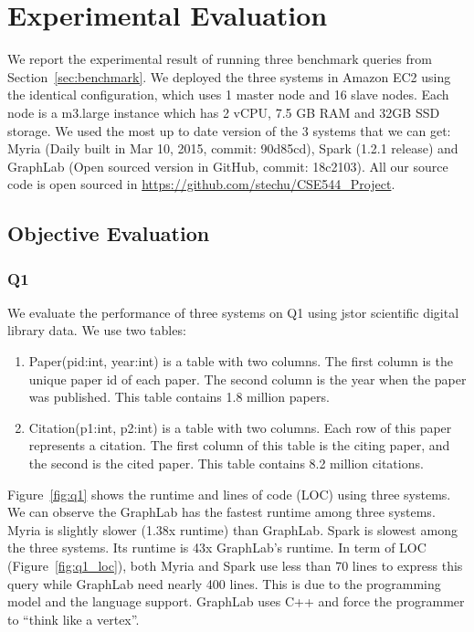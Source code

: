 \section{Experimental Evaluation}

We report the experimental result of running three benchmark queries from 
Section~\ref{sec:benchmark}. We deployed the three systems in Amazon EC2 using 
the identical configuration, which uses 1 master node and 16 slave nodes.
Each node is a m3.large instance which has 2 vCPU, 7.5 GB RAM and 32GB SSD 
storage. We used the most up to date version of the 3 systems that we can get:
Myria (Daily built in Mar 10, 2015, commit: 90d85cd), Spark (1.2.1 release) and
GraphLab (Open sourced version in GitHub, commit: 18c2103). All our source code
is open sourced in \url{https://github.com/stechu/CSE544_Project}.

\subsection{Objective Evaluation}
\label{subsec:obje}

\subsubsection{Q1}

We evaluate the performance of three systems on Q1 using jstor scientific digital
library data. We use two tables: 
\begin{enumerate}
    \item Paper(pid:int, year:int) is a table with two columns. The first column is the unique paper id of each paper. The second column is the year
    when the paper was published. This table contains 1.8 million papers.
    \item Citation(p1:int, p2:int) is a table with two columns. Each row of 
    this paper represents a citation. The first column of this table is the
    citing paper, and the second is the cited paper. This table contains 8.2
    million citations.
\end{enumerate}

Figure~\ref{fig:q1} shows the runtime and lines of code (LOC) using three 
systems. We can observe the GraphLab has the fastest runtime among three 
systems. Myria is slightly slower (1.38x runtime) than GraphLab. Spark is 
slowest among the three systems. Its runtime is 43x GraphLab's runtime.  
In term of LOC (Figure~\ref{fig:q1_loc}), both Myria and Spark use less than 
70 lines to express this query while GraphLab need nearly 400 lines. This is 
due to the programming model and the language support. GraphLab uses C++ and 
force the programmer to ``think like a vertex''.

